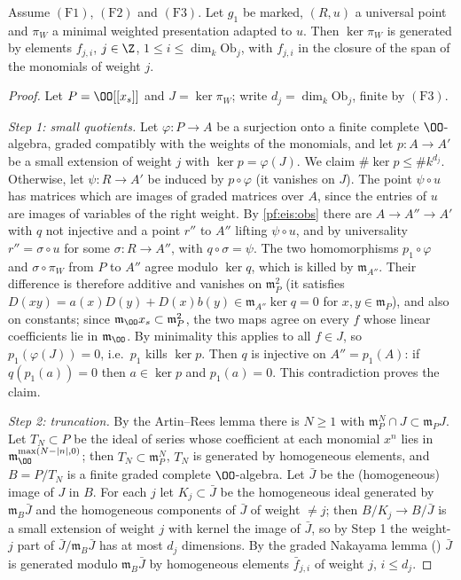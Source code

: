 \begin{proposition}[Relations]\label{pf:eis:rel}
Assume $(\mathrm{F1})$, $(\mathrm{F2})$ and $(\mathrm{F3})$. Let $g_1$ be marked, $(R,u)$ a universal point and $\pi_W$ a minimal weighted
presentation adapted to $u$. Then $\ker\pi_W$ is generated by elements $f_{j,i}$, $j\in\Z$, $1\le i\le\dim_k\mathrm{Ob}_j$, with $f_{j,i}$
in the closure of the span of the monomials of weight $j$.
\end{proposition}

\begin{proof}
Let $P=\OO[[x_s]]$ and $J=\ker\pi_W$; write $d_j=\dim_k\mathrm{Ob}_j$, finite by $(\mathrm{F3})$.

\emph{Step 1: small quotients.} Let $\varphi:P\to A$ be a surjection onto a finite complete $\OO$-algebra, graded compatibly with the
weights of the monomials, and let $p:A\to A'$ be a small extension of weight $j$ with $\ker p=\varphi(J)$. We claim
$\#\ker p\le\#k^{d_j}$. Otherwise, let $\psi:R\to A'$ be induced by $p\circ\varphi$ (it vanishes on $J$). The point $\psi\circ u$ has matrices
which are images of graded matrices over $A$, since the entries of $u$ are images of variables of the right weight. By
\cref{pf:eis:obs} there are $A\to A''\to A'$ with $q$ not injective and a point $r''$ to $A''$ lifting $\psi\circ u$, and by universality
$r''=\sigma\circ u$ for some $\sigma:R\to A''$, with $q\circ\sigma=\psi$. The two homomorphisms $p_1\circ\varphi$ and $\sigma\circ\pi_W$ from $P$ to
$A''$ agree modulo $\ker q$, which is killed by $\mathfrak m_{A''}$. Their difference is therefore additive and vanishes on
$\mathfrak m_P^2$ (it satisfies $D(xy)=a(x)D(y)+D(x)b(y)\in\mathfrak m_{A''}\ker q=0$ for $x,y\in\mathfrak m_P$), and also on constants; since
$\mathfrak m_\OO x_s\subset\mathfrak m_P^2$, the two maps agree on every $f$ whose linear coefficients lie in $\mathfrak m_\OO$. By minimality this
applies to all $f\in J$, so $p_1(\varphi(J))=0$, i.e.\ $p_1$ kills $\ker p$. Then $q$ is injective on $A''=p_1(A)$: if $q(p_1(a))=0$ then
$a\in\ker p$ and $p_1(a)=0$. This contradiction proves the claim.

\emph{Step 2: truncation.} By the Artin--Rees lemma there is $N\ge1$ with $\mathfrak m_P^N\cap J\subset\mathfrak m_PJ$. Let $T_N\subset P$ be the
ideal of series whose coefficient at each monomial $x^n$ lies in $\mathfrak m_\OO^{\max(N-|n|,0)}$; then $T_N\subset\mathfrak m_P^N$, $T_N$ is
generated by homogeneous elements, and $B=P/T_N$ is a finite graded complete $\OO$-algebra. Let $\bar J$ be the (homogeneous)
image of $J$ in $B$. For each $j$ let $K_j\subset\bar J$ be the homogeneous ideal generated by $\mathfrak m_B\bar J$ and the homogeneous components of
$\bar J$ of weight $\ne j$; then $B/K_j\to B/\bar J$ is a small extension of weight $j$ with kernel the image of $\bar J$, so by Step 1 the
weight-$j$ part of $\bar J/\mathfrak m_B\bar J$ has at most $d_j$ dimensions. By the graded Nakayama lemma
() $\bar J$ is generated modulo $\mathfrak m_B\bar J$ by homogeneous elements $\bar f_{j,i}$
of weight $j$, $i\le d_j$.


\end{proof}
